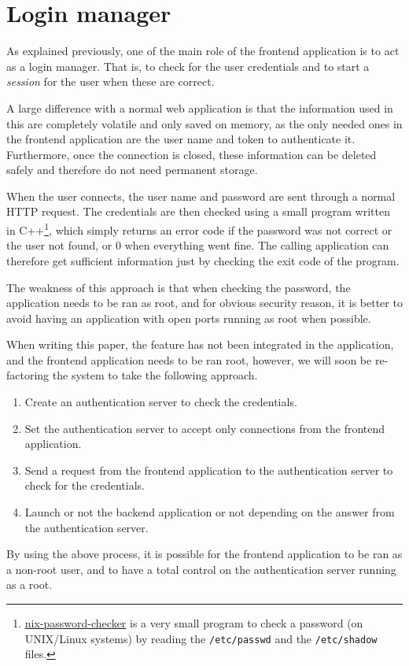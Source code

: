 \section{Login manager}
As explained previously, one of the main role of the frontend application is to act 
as a login manager. That is, to check for the user credentials and to start a 
\emph{session} for the user when these are correct.

A large difference with a normal web application is that the information used 
in this are completely volatile and only saved on memory, as the only 
needed ones in the frontend application are the user name and token to 
authenticate it. Furthermore, once the connection is closed, these information 
can be deleted safely and therefore do not need permanent storage.

When the user connects, the user name and password are sent through a normal 
HTTP request. The credentials are then checked using a small program written 
in C++\footnote{\href{https://github.com/tuvistavie/nix-password-checker}{nix-password-checker} 
  is a very small program to check a password (on UNIX/Linux systems) by reading
  the \lstinline{/etc/passwd} and the \lstinline{/etc/shadow} files.}, which 
simply returns an error code if the password was not correct or the user not found, 
or $0$ when everything went fine. The calling application can therefore get sufficient 
information just by checking the exit code of the program.

The weakness of this approach is that when checking the password, the application needs to be 
ran as root, and for obvious security reason, it is better to avoid having an application with 
open ports running as root when possible. 

When writing this paper, the feature has not been integrated in the application, and 
the frontend application needs to be ran root, however, we will soon be re-factoring 
the system to take the following approach.

\begin{enumerate}
\item Create an authentication server to check the credentials.
\item Set the authentication server to accept only connections from the frontend application.
\item Send a request from the frontend application to the authentication server 
  to check for the credentials.
\item Launch or not the backend application or not depending on the answer from the 
  authentication server.
\end{enumerate}

By using the above process, it is possible for the frontend application to be ran as a non-root
user, and to have a total control on the authentication server running as a root.
